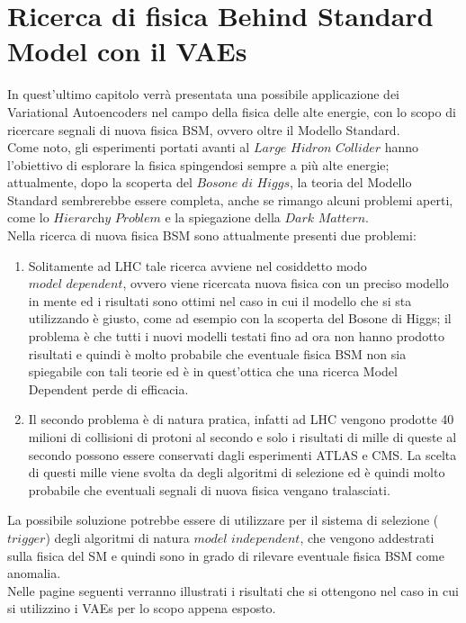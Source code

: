 \section{Ricerca di fisica Behind Standard Model con il VAEs}
\label{fisica_BSM_VAEs}

In quest'ultimo capitolo verrà presentata una possibile applicazione dei Variational Autoencoders nel campo della fisica delle alte energie, con lo scopo di ricercare segnali di nuova fisica BSM, ovvero oltre il Modello Standard. \\
Come noto, gli esperimenti portati avanti al $\textit{Large Hidron Collider}$ hanno l'obiettivo di esplorare la fisica spingendosi sempre a più alte energie; attualmente, dopo la scoperta del $\textit{Bosone di Higgs}$, la teoria del Modello Standard sembrerebbe essere completa, anche se rimango alcuni problemi aperti, come lo $\textit{Hierarchy Problem}$ e la spiegazione della $\textit{Dark Mattern}$. \\
Nella ricerca di nuova fisica BSM sono attualmente presenti due problemi:
\begin{enumerate}
	\item Solitamente ad LHC tale ricerca avviene nel cosiddetto modo $\textit{model dependent}$, ovvero viene ricercata nuova fisica con un preciso modello in mente ed i risultati sono ottimi nel caso in cui il modello che si sta utilizzando è giusto, come ad esempio con la scoperta del Bosone di Higgs; il problema è che tutti i nuovi modelli testati fino ad ora non hanno prodotto risultati e quindi è molto probabile che eventuale fisica BSM non sia spiegabile con tali teorie ed è in quest'ottica che una ricerca Model Dependent perde di efficacia.
	\item Il secondo problema è di natura pratica, infatti ad LHC vengono prodotte 40 milioni di collisioni di protoni al secondo e solo i risultati di mille di queste al secondo possono essere conservati dagli esperimenti ATLAS e CMS. La scelta di questi mille viene svolta da degli algoritmi di selezione ed è quindi molto probabile che eventuali segnali di nuova fisica vengano tralasciati.
\end{enumerate}

La possibile soluzione potrebbe essere di utilizzare per il sistema di selezione ($\textit{trigger}$) degli algoritmi di natura $\textit{model independent}$, che vengono addestrati sulla fisica del SM e quindi sono in grado di rilevare eventuale fisica BSM come anomalia. \\
Nelle pagine seguenti verranno illustrati i risultati che si ottengono nel caso in cui si utilizzino i VAEs per lo scopo appena esposto. \\
